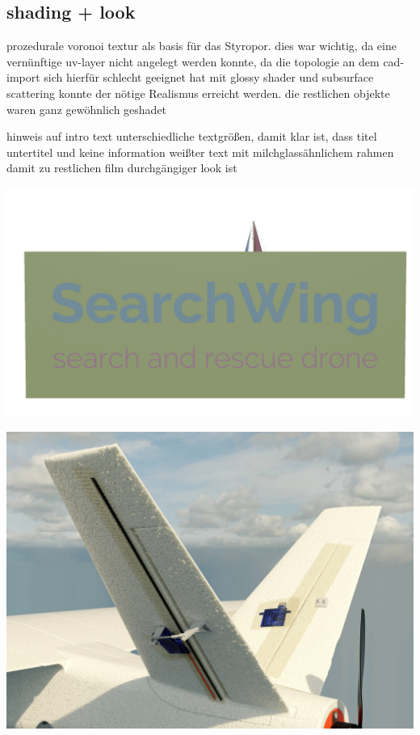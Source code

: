 \subsection{shading + look}

prozedurale voronoi textur als basis für das Styropor. 
dies war wichtig, da eine vernünftige uv-layer nicht angelegt werden konnte, da die topologie an dem cad-import sich hierfür schlecht geeignet hat
mit glossy shader und subsurface scattering konnte der nötige Realismus erreicht werden.
die restlichen objekte waren ganz gewöhnlich geshadet

hinweis auf intro text
unterschiedliche textgrößen, damit klar ist, dass titel untertitel und keine information
weißter text mit milchglassähnlichem rahmen damit zu restlichen film durchgängiger look ist

\includegraphics[width=\textwidth]{gfx/prod/env/intro_text.jpg}


\includegraphics[width=\textwidth]{gfx/prod/plane/shading.jpg}


